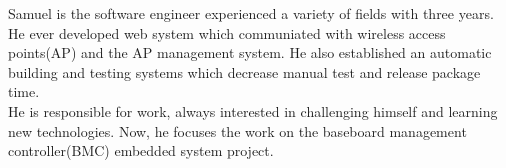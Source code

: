 

\begin{cvparagraph}


Samuel is the software engineer experienced a variety of fields with three years.
He ever developed web system which communiated with wireless access points(AP) and the AP management system.
He also established an automatic building and testing systems which decrease manual test and release package time. \\
He is responsible for work, always interested in challenging himself and learning new technologies.
Now, he focuses the work on the  baseboard management controller(BMC) embedded system project.
\end{cvparagraph}
